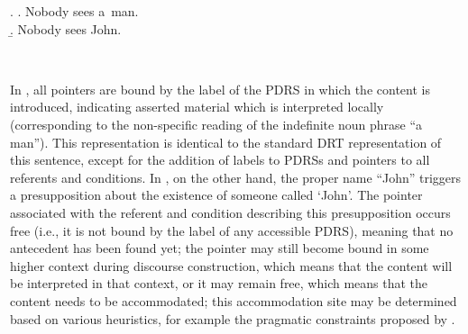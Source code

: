 \begin{flushleft}
\begin{minipage}{0.9\linewidth}
  \begin{multicols}{2}
\ex. \a. Nobody sees a~man.\\
\b. Nobody sees John.\\

\end{multicols}
\end{minipage}\\
\end{flushleft}

\noindent In \Last[a], all pointers are bound by the label of the PDRS in
which the content is introduced, indicating asserted material which is
interpreted locally (corresponding to the non-specific reading of the
indefinite noun phrase ``a man'').  This representation is identical to the
standard DRT representation of this sentence, except for the addition of
labels to PDRSs and pointers to all referents and conditions. In \Last[b],
on the other hand, the proper name ``John'' triggers a presupposition about
the existence of someone called `John'.  The pointer associated with the
referent and condition describing this presupposition occurs free (i.e., it
is not bound by the label of any accessible PDRS), meaning that no
antecedent has been found yet; the pointer may still become bound in some
higher context during discourse construction, which means that the content
will be interpreted in that context, or it may remain free, which means that
the content needs to be accommodated; this accommodation site may be
determined based on various heuristics, for example the pragmatic
constraints proposed by \cite{sandt1992presupposition}.

